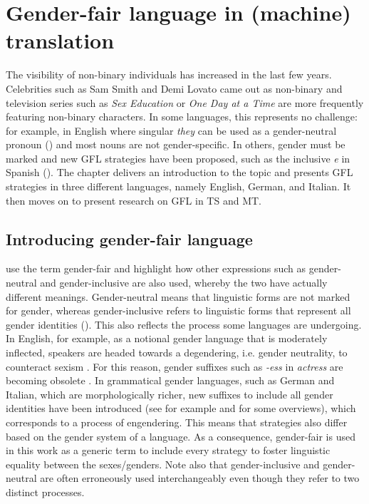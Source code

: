 \chapter{Gender-fair language in (machine) translation} \label{Chapter2-3}

The visibility of non-binary individuals has increased in the last few years. Celebrities such as Sam Smith and Demi Lovato came out as non-binary and television series such as \textit{Sex Education} or \textit{One Day at a Time} are more frequently featuring non-binary characters. In some languages, this represents no challenge: for example, in English where singular \textit{they} can be used as a gender-neutral pronoun (\cite{apasingularthey}) and most nouns are not gender-specific. In others, gender must be marked and new GFL strategies have been proposed, such as the inclusive \textit{e} in Spanish (\cite{lopez2019tu}). The chapter delivers an introduction to the topic and presents GFL strategies in three different languages, namely English, German, and Italian. It then moves on to present research on GFL in TS and MT.

\section{Introducing gender-fair language} \label{inclusivelanguage}
\textcite{sczesny2016can} use the term gender-fair and highlight how other expressions such as gender-neutral and gender-inclusive are also used, whereby the two have actually different meanings. Gender-neutral means that linguistic forms are not marked for gender, whereas gender-inclusive refers to linguistic forms that represent all gender identities (\cite[28]{hornscheidt2021wie}). This also reflects the process some languages are undergoing. In English, for example, as a notional gender language that is moderately inflected, speakers are headed towards a degendering, i.e. gender neutrality, to counteract sexism \citep[17]{weatherall2002gender}. For this reason, gender suffixes such as \textit{-ess} in \textit{actress} are becoming obsolete \citep[220]{eckert2013language}. In grammatical gender languages, such as German and Italian, which are morphologically richer, new suffixes to include all gender identities have been introduced (see for example \cite{hornscheidt2021wie} and \cite{vitiello2021linguaggio} for some overviews), which corresponds to a process of engendering. This means that strategies also differ based on the gender system of a language. As a consequence, gender-fair is used in this work as a generic term to include every strategy to foster linguistic equality between the sexes/genders. Note also that gender-inclusive and gender-neutral are often erroneously used interchangeably even though they refer to two distinct processes. 

